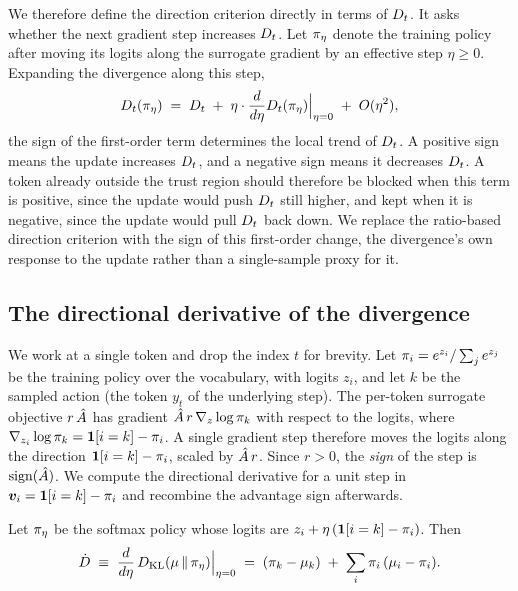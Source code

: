 We therefore define the direction criterion directly in terms of $D_t$.
It asks whether the next gradient step increases $D_t$.
Let $\pi_\eta$ denote the training policy after moving its logits along the
surrogate gradient by an effective step $\eta\ge0$.
Expanding the divergence along this step,
\begin{equation}
\label{eq:taylor-def}
D_t(\pi_\eta) \;=\; D_t \;+\; \eta\cdot \frac{d}{d\eta}D_t(\pi_\eta)\Big|_{\eta=0} \;+\; O(\eta^2),
\end{equation}
the sign of the first-order term determines the local trend of $D_t$.
A positive sign means the update increases $D_t$, and a negative sign means
it decreases $D_t$.
A token already outside the trust region should therefore be blocked when this
term is positive, since the update would push $D_t$ still higher, and kept
when it is negative, since the update would pull $D_t$ back down.
We replace the ratio-based direction criterion with the sign of this first-order
change, the divergence's own response to the update rather than a single-sample
proxy for it.

\subsection{The directional derivative of the divergence}
\label{sec:method-derivation}

We work at a single token and drop the index $t$ for brevity. Let
$\pi_i = e^{z_i}/\sum_j e^{z_j}$ be the training policy over the vocabulary,
with logits $z_i$, and let $k$ be the sampled action (the token $y_t$ of the
underlying step). The per-token surrogate
objective $r\,\hat{A}$ has gradient $\hat{A}\,r\,\nabla_z\log\pi_k$ with respect to the
logits, where $\nabla_{z_i}\log\pi_k=\bm{1}[i=k]-\pi_i$. A single gradient step therefore moves the
logits along the direction $\bm{1}[i=k]-\pi_i$, scaled by $\hat{A}\,r$.
Since $r>0$, the \emph{sign} of the step is $\operatorname{sign}(\hat{A})$.
We compute the directional derivative for a
unit step in $\bm{v}_i=\bm{1}[i=k]-\pi_i$ and recombine the advantage sign afterwards.

\begin{proposition}
\label{prop:dir-deriv}
Let $\pi_\eta$ be the softmax policy whose logits are $z_i+\eta\,(\bm{1}[i=k]-\pi_i)$.
Then
\begin{equation}
\label{eq:taylor-coeff}
\dot{D} \;\equiv\; \frac{d}{d\eta}\,D_{\mathrm{KL}}(\mu\,\|\,\pi_\eta)\Big|_{\eta=0}
\;=\; (\pi_k-\mu_k) \;+\; \sum_i \pi_i\,(\mu_i-\pi_i).
\end{equation}
\end{proposition}

